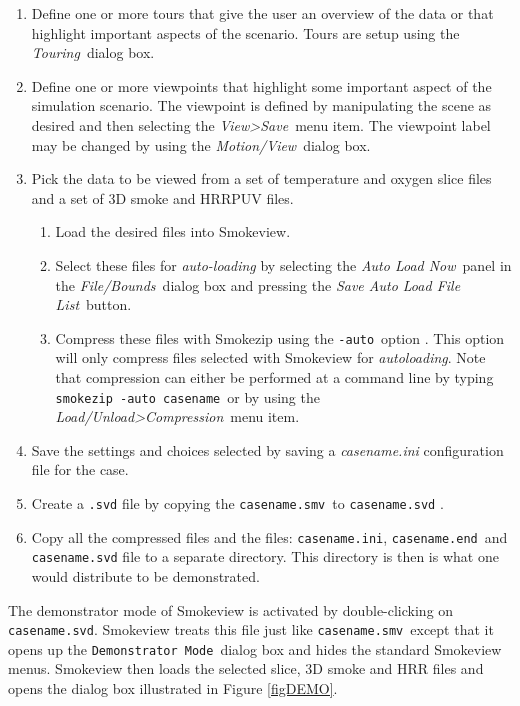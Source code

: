 \documentclass[11pt,twoside]{book}
\begin{document}
\begin{enumerate}
  \item Define one or more tours that give the user an overview of the data or that highlight important
  aspects of the scenario.   Tours are setup using the {\em Touring}\ dialog box.
  \item Define one or more viewpoints that highlight some important
  aspect of the simulation scenario.  The viewpoint is defined by manipulating the scene as desired and then selecting the {\em View>Save}\ menu item.  The viewpoint label may be changed by using the {\em Motion/View}\ dialog box.
  \item Pick the data to be viewed from a set of temperature and oxygen slice files and a set of 3D smoke and HRRPUV files.
  \begin{enumerate}
    \item Load the desired files into Smokeview.
    \item Select these files for {\em auto-loading} by selecting the {\em Auto Load Now}\ panel
    in the {\em File/Bounds}\ dialog box and pressing the {\em Save Auto Load File List}\ button.
    \item Compress these files with Smokezip using the {\tt -auto}\ option .  This option will only compress files selected with Smokeview for {\em autoloading}.  Note that compression can either be performed at a command line by typing {\tt smokezip -auto casename}\ or by using the {\em Load/Unload>Compression}\ menu item.
      \end{enumerate}
  \item Save the settings and choices selected by saving a {\em casename.ini} configuration file for the case.
  \item Create a {\tt .svd} file by copying the {\tt casename.smv}\ to {\tt casename.svd} .
  \item Copy all the compressed files and the files: {\tt casename.ini}, {\tt casename.end}\ and {\tt casename.svd} file to a separate directory.  This directory is then is what one would distribute to be demonstrated.
\end{enumerate}

The demonstrator mode of Smokeview is activated by double-clicking on {\tt casename.svd}.  Smokeview treats this file just like {\tt casename.smv}\ except that it opens up the {\tt Demonstrator Mode}\ dialog box and hides the standard Smokeview menus.  Smokeview then
loads the selected slice, 3D smoke and HRR files and opens the dialog box illustrated in
Figure \ref{figDEMO}.
\end{document}
